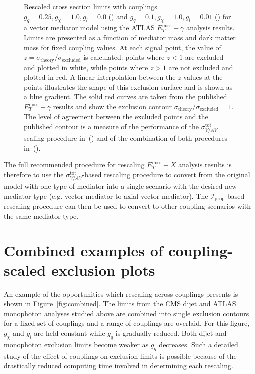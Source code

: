 \documentclass[a4paper, 11pt]{article}
\newcommand{\MET}{\ensuremath{E_T^\mathrm{miss}}\xspace}
\newcommand{\met}{\MET}
\newcommand{\metplusx}{\ensuremath{\MET+X}\xspace}
\begin{document}
\begin{figure}[htp!]
\begin{center}
  \caption{Rescaled cross section limits with couplings $g_q=0.25, g_\chi=1.0, g_l = 0.0$ () and $g_q=0.1, g_\chi=1.0, g_l = 0.01$ () for a vector mediator model using the ATLAS $\met+\gamma$ analysis results. Limits are presented as a function of mediator mass and dark matter mass for fixed coupling values. At each signal point, the value of $z = \sigma_{\text{theory}}/\sigma_{\text{excluded}}$ is calculated: points where $z<1$ are excluded and plotted in white, while points where $z>1$ are not excluded and plotted in red. A linear interpolation between the $z$ values at the points illustrates the shape of this exclusion surface and is shown as a blue gradient. The solid red curves are taken from the published $\met+\gamma$ results and show the exclusion contour $\sigma_{\text{theory}}/\sigma_{\text{excluded}} = 1$. The level of agreement between the excluded points and the published contour is a measure of the performance of the $\sigma_{V/AV}^{\text{tot}}$ scaling procedure in~() and of the combination of both procedures in~().
  }
  \label{fig:pdf_scaling}
  \end{center}
\end{figure}

The full recommended procedure for rescaling \metplusx analysis results is therefore to use the $\sigma_{V/AV}^{\text{tot}}$-based rescaling procedure to convert from the original model with one type of mediator into a single scenario with the desired new mediator type (e.g. vector mediator to axial-vector mediator). The $\mathcal{I}_{\text{prop}}$-based rescaling procedure can then be used to convert to other coupling scenarios with the same mediator type.

\section{Combined examples of coupling-scaled exclusion plots}

An example of the opportunities which rescaling across couplings presents is shown in Figure~\ref{fig:combined}. The limits from the CMS dijet and ATLAS monophoton analyses studied above are combined into single exclusion contours for a fixed set of couplings and a range of couplings are overlaid. For this figure, $g_\chi$ and $g_l$ are held constant while $g_q$ is gradually reduced. Both dijet and monophoton exclusion limits become weaker as $g_q$ decreases. Such a detailed study of the effect of couplings on exclusion limits is possible because of the drastically reduced computing time involved in determining each rescaling.
\end{document}
